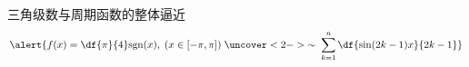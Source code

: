 
\begin{frame}{三角级数与周期函数的整体逼近}
	\linespread{1.2}
	\vspace{-1em}
	$$\alert{f(x)=\df{\pi}{4}\mathrm{sgn}(x),\;(x\in[-\pi,\pi])
	\;\uncover<2->{\sim\;\sum\limits_{k=1}^n\df{\sin(2k-1)x}{2k-1}}}$$
	\begin{center}
\end{center}
\end{frame}
